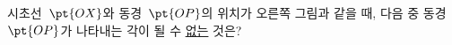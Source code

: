 \noindent\begin{minipage}[t]{0.58\linewidth}\vspace{0pt}\raggedright 시초선~$\pt{OX}$와 동경~$\pt{OP}$의 위치가 오른쪽 그림과 같을 때, 다음 중 동경~$\pt{OP}$가 나타내는 각이 될 수 \underline{없는} 것은?\end{minipage}\hfill\begin{minipage}[t]{0.4\linewidth}\vspace{0pt}\centering \resizebox{\ifdim\width>\linewidth\linewidth\else\width\fi}{!}{}\end{minipage}\par
{}
